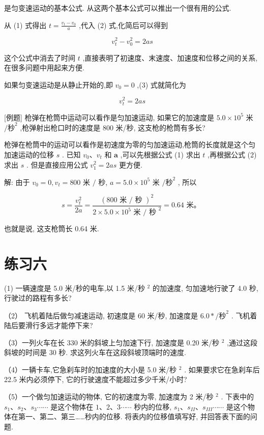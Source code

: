 \documentclass[10pt]{article}
\begin{document}
是匀变速运动的基本公式. 从这两个基本公式可以推出一个很有用的公式.

从 (1) 式得出 \(t = \frac{{v}_{t} - {v}_{0}}{a}\) ,代入 (2) 式,化简后可以得到

\[
{v}_{t}^{2} - {v}_{0}^{2} = {2as} \tag{3}
\]

这个公式中消去了时间 \(t\) ,直接表明了初速度、末速度、加速度和位移之间的关系, 在很多问题中用起来方便.

如果匀变速运动是从静止开始的,即 \({v}_{0} = 0\) ,(3) 式就简化为

\[
{v}_{t}^{2} = {2as}
\]

[例题] 枪弹在枪筒中运动可以看作是匀加速运动, 如果它的加速度是 \({5.0} \times {10}^{5}\) 米 \(/{\text{秒}}^{2}\) ,枪弹射出枪口时的速度是 800 米/秒, 这支枪的枪筒有多长?

枪弹在枪筒中的运动可以看作是初速度为零的匀加速运动,枪筒的长度就是这个匀加速运动的位移 \(s\) . 已知 \({v}_{0}\text{、}{v}_{t}\) 和 \(\mathbf{a}\) ,可以先根据公式 (1) 求出 \(t\) ,再根据公式 (2) 求出 \(s\) . 但是直接应用公式 \({v}_{1}^{2} = {2as}\) 更方便.

解: 由于 \({v}_{0} = 0,{v}_{t} = {800}\) 米 \(/\) 秒, \(a = {5.0} \times {10}^{5}\) 米 \(/{秒}^{2}\) , 所以

\[
s = \frac{{v}_{t}^{2}}{2a} = \frac{{\left( {800}\text{ 米 }/\text{ 秒 }\right) }^{2}}{2 \times {5.0} \times {10}^{5}\text{ 米 }/{\text{ 秒 }}^{2}} = {0.64}\text{ 米。 }
\]

也就是说, 这支枪筒长 0.64 米.

\section*{练习六}

(1) 一辆速度是 5.0 米/秒的电车,以 1.5 米/秒 \({}^{2}\) 的加速度, 匀加速地行驶了 4.0 秒, 行驶过的路程有多长?

（2） 飞机着陆后做匀减速运动, 初速度是 60 米/秒, 加速度是 \({6.0} * /{秒}^{2}\) . 飞机着陆后要滑行多远才能停下来?

（3）一列火车在长 330 米的斜坡上匀加速下行, 加速度是 0.20 米/秒 \({}^{2}\) ,通过这段斜坡的时间是 30 秒. 求这列火车在这段斜坡顶端时的速度.

（4）一辆卡车,它急刹车时的加速度的大小是 5.0 米/秒 \({}^{2}\) . 如果要求它在急刹车后 22.5 米内必须停下, 它的行驶速度不能超过多少千米/小时?

（5）一个做匀加速运动的物体, 它的初速度为零, 加速度为 2 米/秒 \({}^{2}\) . 下表中的 \({s}_{1}\text{、}{s}_{2}\text{、}{s}_{3}\cdots \cdots\) 是这个物体在 \(1\text{、}2\text{、}3\cdots \cdots\) 秒内的位移, \({s}_{1}\text{、}{s}_{II}\text{、}{s}_{III}\cdots \cdots\) 是这个物体在第一、第二、第三……秒内的位移. 将表内的位移值填写好, 并回答表下面的问题.
\end{document}
